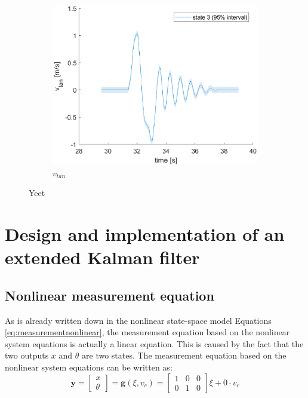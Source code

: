 \documentclass[a4paper,kul]{kulakarticle} %
\begin{document}
\begin{figure}[htp!]
\begin{subfigure}[b]{0.48\textwidth}
		\includegraphics[width=\textwidth]{state3.eps}
		\caption{$v_{tan}$}
	\end{subfigure}
	\caption{Yeet} 
	\label{fig:yeet}
\end{figure}




	
\section{Design and implementation of an extended Kalman filter}
\subsection{Nonlinear measurement equation}
As is already written down in the nonlinear state-space model Equations \ref{eq:measurementnonlinear}, the measurement equation based on the nonlinear system equations is actually a linear equation. This is caused by the fact that the two outputs $x$ and $\theta$ are two states. The measurement equation based on the nonlinear system equations can be written as:
\begin{equation}
	\mathbf{y} = \begin{bmatrix}
	x\\\theta
	\end{bmatrix} = \mathbf{g}(\xi,v_c) = \begin{bmatrix}
	1&0&0\\0&1&0
	\end{bmatrix}\xi + 0 \cdot v_c
	\label{eq:g}
\end{equation}
\end{document}
